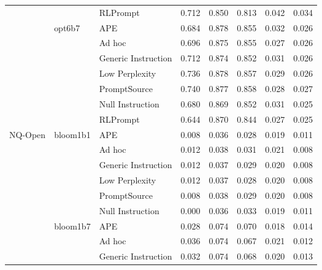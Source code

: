 \begin{supertabular}{lllrrrrr}
              &        & RLPrompt &            0.712 &           0.850 &          0.813 &        0.042 &    0.034 \\
              & opt6b7 & APE &            0.684 &           0.878 &          0.855 &        0.032 &    0.026 \\
              &        & Ad hoc &            0.696 &           0.875 &          0.855 &        0.027 &    0.026 \\
              &        & Generic Instruction &            0.712 &           0.874 &          0.852 &        0.031 &    0.026 \\
              &        & Low Perplexity &            0.736 &           0.878 &          0.857 &        0.029 &    0.026 \\
              &        & PromptSource &            0.740 &           0.877 &          0.858 &        0.028 &    0.027 \\
              &        & Null Instruction &            0.680 &           0.869 &          0.852 &        0.031 &    0.025 \\
              &        & RLPrompt &            0.644 &           0.870 &          0.844 &        0.027 &    0.025 \\
NQ-Open & bloom1b1 & APE &            0.008 &           0.036 &          0.028 &        0.019 &    0.011 \\
              &        & Ad hoc &            0.012 &           0.038 &          0.031 &        0.021 &    0.008 \\
              &        & Generic Instruction &            0.012 &           0.037 &          0.029 &        0.020 &    0.008 \\
              &        & Low Perplexity &            0.012 &           0.037 &          0.028 &        0.020 &    0.008 \\
              &        & PromptSource &            0.008 &           0.038 &          0.029 &        0.020 &    0.008 \\
              &        & Null Instruction &            0.000 &           0.036 &          0.033 &        0.019 &    0.011 \\
              & bloom1b7 & APE &            0.028 &           0.074 &          0.070 &        0.018 &    0.014 \\
              &        & Ad hoc &            0.036 &           0.074 &          0.067 &        0.021 &    0.012 \\
              &        & Generic Instruction &            0.032 &           0.074 &          0.068 &        0.020 &    0.013 \\

\end{supertabular}
